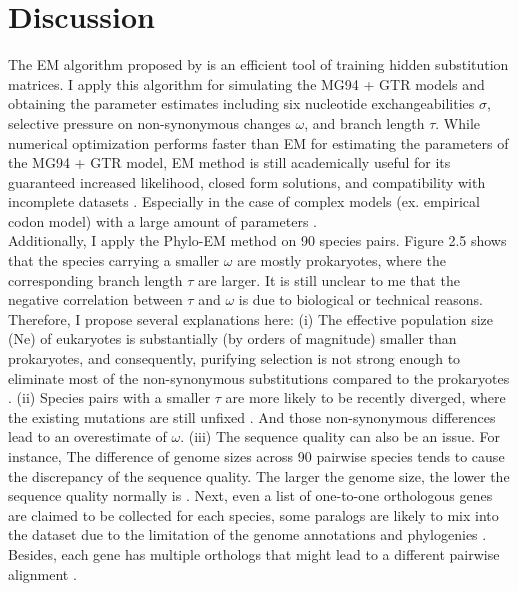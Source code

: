 \section{Discussion}
The EM algorithm proposed by \cite{holmes2002expectation} is an efficient tool of training hidden substitution matrices. I apply this algorithm for simulating the MG94 + GTR models and obtaining the parameter estimates including six nucleotide exchangeabilities $\sigma$, selective pressure on non-synonymous changes $\omega$, and branch length $\tau$. While numerical optimization performs faster than EM for estimating the parameters of the MG94 + GTR model, EM method is still academically useful for its guaranteed increased likelihood, closed form solutions, and compatibility with incomplete datasets \parencite{couvreur1997algorithm}. Especially in the case of complex models (ex. empirical codon model) with a large amount of parameters \parencite{kosiol2007empirical}. \\
\indent Additionally, I apply the Phylo-EM method on 90 species pairs. Figure 2.5 shows that the species carrying a smaller $\omega$ are mostly prokaryotes, where the corresponding branch length $\tau$ are larger. It is still unclear to me that the negative correlation between $\tau$ and $\omega$ is due to biological or technical reasons. Therefore, I propose several explanations here: (i) The effective population size (Ne) of eukaryotes is substantially (by orders of magnitude) smaller than prokaryotes, and consequently, purifying selection is not strong enough to eliminate most of the non-synonymous substitutions compared to the prokaryotes \parencite{sela2016theory}. (ii) Species pairs with a smaller $\tau$ are more likely to be recently diverged, where the existing mutations are still unfixed \parencite{charlesworth2020long}. And those non-synonymous differences lead to an overestimate of $\omega$. (iii) The sequence quality can also be an issue. For instance, The difference of genome sizes across 90 pairwise species tends to cause the discrepancy of the sequence quality. The larger the genome size, the lower the sequence quality normally is \parencite{baker2012novo}. Next, even a list of one-to-one orthologous genes are claimed to be collected for each species, some paralogs are likely to mix into the dataset due to the limitation of the genome annotations and phylogenies \parencite{smith2021new}. Besides, each gene has multiple orthologs that might lead to a different pairwise alignment \parencite{studer2009confident}. \\
